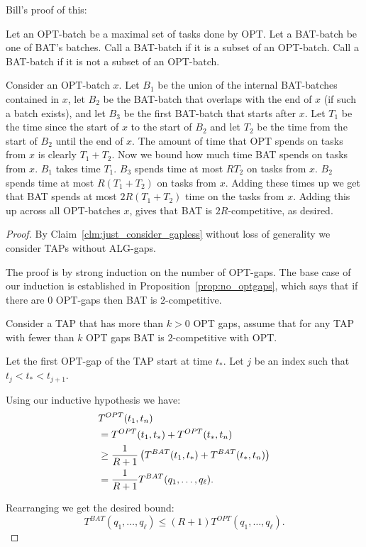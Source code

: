 {\color{red}
  Bill's proof of this:

  Let an OPT-batch be a maximal set of tasks done by OPT. Let a
  BAT-batch be one of BAT's batches. Call a BAT-batch
   if it is a subset of an OPT-batch. Call a
  BAT-batch  if it is not a subset of an
  OPT-batch. 

  Consider an OPT-batch $x$. Let $B_1$ be the union of the
  internal BAT-batches contained in $x$, let $B_2$ be the
  BAT-batch that overlaps with the end of $x$ (if such a batch
  exists), and let $B_3$ be the first BAT-batch that starts after
  $x$. Let $T_1$ be the time since the start of $x$ to the start
  of $B_2$ and let $T_2$ be the time from the start of $B_2$
  until the end of $x$. The amount of time that OPT spends on
  tasks from $x$ is clearly $T_1+T_2$. Now we bound how much time
  BAT spends on tasks from $x$. $B_1$ takes time $T_1$. $B_3$
  spends time at most $RT_2$ on tasks from $x$. $B_2$ spends time
  at most $R(T_1 + T_2)$ on tasks from $x$. Adding these times up
  we get that BAT spends at most $2R(T_1+T_2)$ time on the tasks
  from $x$. Adding this up across all OPT-batches $x$, gives that
  BAT is $2R$-competitive, as desired.

}

\begin{proof}
  By Claim~\ref{clm:just_consider_gapless} without loss of
  generality we consider TAPs without ALG-gaps.

  The proof is by strong induction on the number of OPT-gaps. 
  The base case of our induction is established in
  Proposition~\ref{prop:no_optgaps}, which says that if there are $0$
  OPT-gaps then BAT is $2$-competitive. 

  Consider a TAP that has more than $k > 0$ OPT gaps, assume that
  for any TAP with fewer than $k$ OPT gaps BAT is $2$-competitive
  with OPT.

  Let the first OPT-gap of the TAP start at time $t_*$.
  Let $j$ be an index such that $t_j < t_* < t_{j+1}$.

  Using our inductive hypothesis we have:
  \begin{align*}
  &T^{OPT}(t_1, t_n) \\
  &= T^{OPT}(t_1, t_*) + T^{OPT}(t_*, t_n)\\
  &\ge \frac{1}{R+1}\left( T^{BAT}(t_1, t_*) + T^{BAT}(t_*, t_n) \right)\\
  &=\frac{1}{R+1} T^{BAT}(q_1, \ldots, q_\ell).
  \end{align*}

  Rearranging we get the desired bound:
  $$T^{BAT}(q_1, \ldots, q_\ell) \le (R+1) T^{OPT}(q_1, \ldots, q_\ell).$$
\end{proof}

